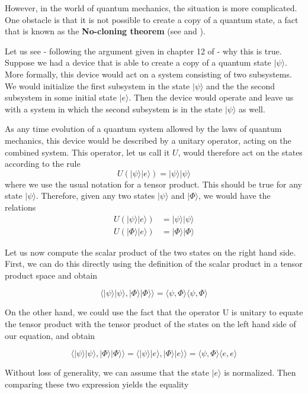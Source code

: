 \documentclass[a4paper, draft]{article}
\theoremstyle{own}
\theoremstyle{remark}
\begin{document}
However, in the world of quantum mechanics, the situation is more complicated. One obstacle is that it is not possible to create a copy of a quantum state, a fact that is known as the {\bf No-cloning theorem} (see \cite{Dieks} and \cite{WootersZurek}). 

Let us see - following the argument given in chapter 12 of \cite{NC} -  why this is true. Suppose we had a device that is able to create a copy of a quantum state $|\psi \rangle $. More formally, this device would act on a system consisting of two subsystems. We would initialize the first subsystem in the state $|\psi\rangle$ and the the second subsystem in some initial state $|e \rangle$. Then the device would operate and leave us with a system in which the second subsystem is in the state $|\psi \rangle$ as well.

As any time evolution of a quantum system allowed by the laws of quantum mechanics, this device would be described by a unitary operator, acting on the combined system. This operator, let us call it $U$, would therefore act on the states according to the rule
$$
U(|\psi \rangle |e \rangle) = |\psi \rangle |\psi \rangle
$$
where we use the usual notation for a tensor product. This should be true for any state $|\psi \rangle$. Therefore, given any two states $|\psi \rangle$ and $|\Phi \rangle$, we would have the relations
\begin{align*}
U(|\psi \rangle |e \rangle) &= |\psi \rangle |\psi \rangle \\
U(|\Phi \rangle |e \rangle) &= |\Phi \rangle |\Phi \rangle
\end{align*}

Let us now compute the scalar product of the two states on the right hand side. First, we can do this directly using the definition of the scalar product in a tensor product space and obtain

$$
\langle |\psi \rangle |\psi \rangle , |\Phi \rangle |\Phi \rangle \rangle 
=
\langle \psi, \Phi \rangle \langle \psi, \Phi \rangle
$$

On the other hand, we could use the fact that the operator U is unitary to equate the tensor product with the tensor product of the states on the left hand side of our equation, and obtain 

$$
\langle |\psi \rangle |\psi \rangle , |\Phi \rangle |\Phi \rangle \rangle 
=
\langle |\psi \rangle |e \rangle , |\Phi \rangle |e \rangle \rangle 
= 
\langle \psi, \Phi \rangle  \langle e, e \rangle
$$

Without loss of generality, we can assume that the state  $|e \rangle$ is normalized. Then comparing these two expression yields the equality
\end{document}
